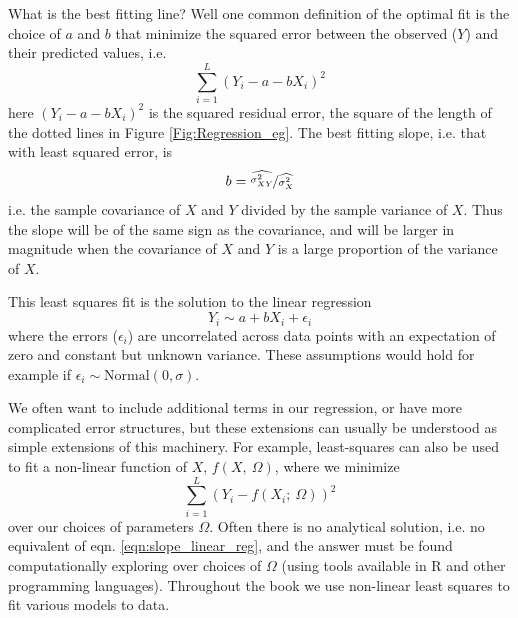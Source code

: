 What
is the best fitting line? Well one common definition of the optimal fit is
the choice of $a$ and $b$ that minimize the squared error
between the observed ($Y$) and their predicted values, i.e.
\begin{equation}
\sum_{i=1}^L  (Y_i  - a -  b X_i )^2
\end{equation}
here $(Y_i  - a -  b X_i)^2$ is the squared residual error, the square
of the length of the dotted lines in Figure
\ref{Fig:Regression_eg}. The best fitting slope, i.e. that with least
squared error, is
\begin{equation}
b = \nicefrac{ \widehat{\sigma_{XY}^2}}{ \widehat{\sigma_{X}^2}} \label{eqn:slope_linear_reg}
\end{equation}
i.e. the sample covariance of $X$ and $Y$ divided by the sample
variance of $X$. Thus the slope will be of the same sign as the
covariance, and will be larger in magnitude when the covariance of $X$
and $Y$ is a large proportion of the variance of $X$.

This least squares fit is the solution to the linear regression
\begin{equation}
Y_i \sim a+ b X_i + \epsilon_i
\end{equation}
where the errors ($\epsilon_i$) are uncorrelated across data points
with an expectation of zero and constant but unknown variance. These
assumptions would hold for example if $\epsilon_i \sim \textrm{Normal}(0,\sigma)$.


We often want to include additional terms in our regression, or have
more complicated error structures, but these
extensions can usually be understood as simple extensions of this
machinery. For example, least-squares can also be used to fit a non-linear
function of $X$, $f(X,~\Omega)$, 
where we minimize 
\begin{equation}
\sum_{i=1}^L  (Y_i  -f(X_i; ~\Omega ))^2
\end{equation}
over our choices of parameters $\Omega$. Often there is no analytical
solution, i.e. no equivalent of eqn. \ref{eqn:slope_linear_reg}, and
the answer must be found computationally exploring over choices of
$\Omega$ (using tools available in
R and other programming languages). Throughout the book we use
non-linear least squares to fit various models to data.


